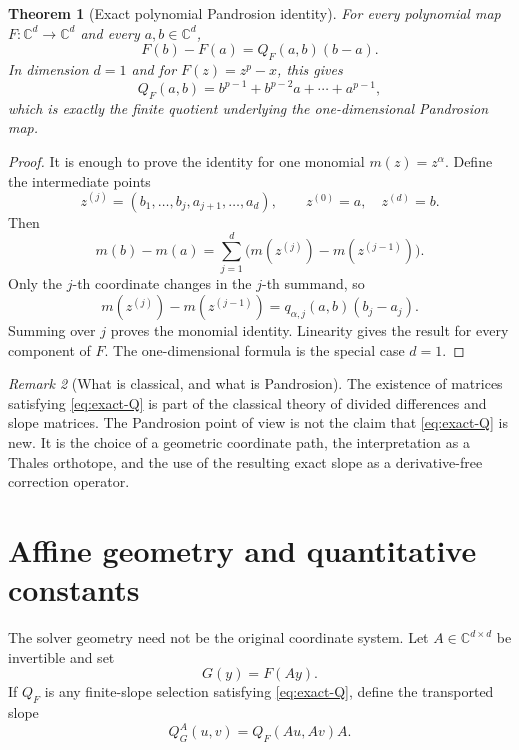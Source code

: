 \documentclass[11pt]{article}
\newtheorem{theorem}{Theorem}[section]
\theoremstyle{definition}
\theoremstyle{remark}
\newtheorem{remark}[theorem]{Remark}
\newcommand{\C}{\mathbb{C}}
\begin{document}
\begin{theorem}[Exact polynomial Pandrosion identity]\label{thm:exact-Q}
For every polynomial map $F:\C^d\to\C^d$ and every $a,b\in\C^d$,
\begin{equation}\label{eq:exact-Q}
        F(b)-F(a)=Q_F(a,b)(b-a).
\end{equation}
In dimension $d=1$ and for $F(z)=z^p-x$, this gives
\[
        Q_F(a,b)=b^{p-1}+b^{p-2}a+\cdots+a^{p-1},
\]
which is exactly the finite quotient underlying the one-dimensional Pandrosion map.
\end{theorem}

\begin{proof}
It is enough to prove the identity for one monomial $m(z)=z^\alpha$.  Define the intermediate points
\[
        z^{(j)}=(b_1,\dots,b_j,a_{j+1},\dots,a_d),
        \qquad z^{(0)}=a,
        \quad z^{(d)}=b.
\]
Then
\[
        m(b)-m(a)=\sum_{j=1}^d \bigl(m(z^{(j)})-m(z^{(j-1)})\bigr).
\]
Only the $j$-th coordinate changes in the $j$-th summand, so
\[
        m(z^{(j)})-m(z^{(j-1)})
        =q_{\alpha,j}(a,b)(b_j-a_j).
\]
Summing over $j$ proves the monomial identity.  Linearity gives the result for every component of $F$.  The one-dimensional formula is the special case $d=1$.
\end{proof}

\begin{remark}[What is classical, and what is Pandrosion]
The existence of matrices satisfying \eqref{eq:exact-Q} is part of the classical theory of divided differences and slope matrices.  The Pandrosion point of view is not the claim that \eqref{eq:exact-Q} is new.  It is the choice of a geometric coordinate path, the interpretation as a Thales orthotope, and the use of the resulting exact slope as a derivative-free correction operator.
\end{remark}

\section{Affine geometry and quantitative constants}

The solver geometry need not be the original coordinate system.  Let $A\in\C^{d\times d}$ be invertible and set
\[
        G(y)=F(Ay).
\]
If $Q_F$ is any finite-slope selection satisfying \eqref{eq:exact-Q}, define the transported slope
\begin{equation}\label{eq:transport}
        Q_G^A(u,v)=Q_F(Au,Av)A.
\end{equation}
\end{document}
